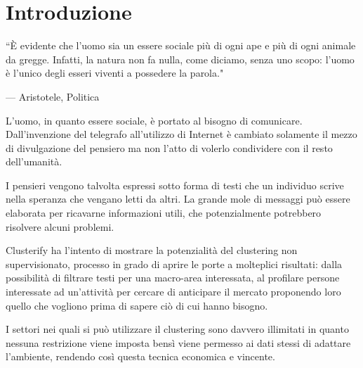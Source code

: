 \chapter{Introduzione}

\epigraph{``È evidente che l’uomo sia un essere sociale più di ogni ape e più di ogni animale da gregge. Infatti, la natura non fa nulla, come diciamo, senza uno scopo: l’uomo è l’unico degli esseri viventi a possedere la parola."}{--- \textup{Aristotele}, Politica }

L'uomo, in quanto essere sociale, è portato al bisogno di comunicare. Dall'invenzione del telegrafo all'utilizzo di Internet è cambiato solamente il mezzo di divulgazione del pensiero ma non l'atto di volerlo condividere con il resto dell'umanità.

I pensieri vengono talvolta espressi sotto forma di testi che un individuo scrive nella speranza che vengano letti da altri. La grande mole di messaggi può essere elaborata per ricavarne informazioni utili, che potenzialmente potrebbero risolvere alcuni problemi.

Clusterify ha l'intento di mostrare la potenzialità del clustering non supervisionato, processo in grado di aprire le porte a molteplici risultati: dalla possibilità di filtrare testi per una macro-area interessata, al profilare persone interessate ad un'attività per cercare di anticipare il mercato proponendo loro quello che vogliono prima di sapere ciò di cui hanno bisogno.

 I settori nei quali si può utilizzare il clustering sono davvero illimitati in quanto nessuna restrizione viene imposta bensì viene permesso ai dati stessi di adattare l'ambiente, rendendo così questa tecnica economica e vincente.